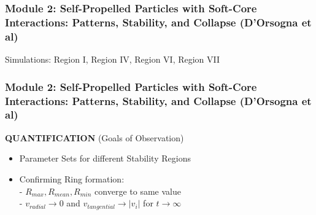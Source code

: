 \documentclass[compress]{beamer}
\begin{document}
\begin{frame}
  \frametitle{Module 2: Self-Propelled Particles with Soft-Core Interactions: Patterns, Stability, and Collapse (D'Orsogna et al)}
	
	
	Simulations: Region I, Region IV, Region VI, Region VII 
%	
	
\end{frame}

%	
%	
%	
%


%	
%	
%


\begin{frame}
  \frametitle{Module 2: Self-Propelled Particles with Soft-Core Interactions: Patterns, Stability, and Collapse (D'Orsogna et al)}
	
	\textbf{QUANTIFICATION} \small (Goals of Observation) \normalsize
	
	\begin{itemize}
		\item Parameter Sets for different Stability Regions
		\item Confirming Ring formation: \\
			- \( R_{max}, R_{mean}, R_{min} \) converge to same value \\
			- \( v_{radial} \to 0 \) and \( v_{tangential} \to | v_{i} |  \) for \( t \to \infty \)
	\end{itemize}
\end{frame}
\end{document}
